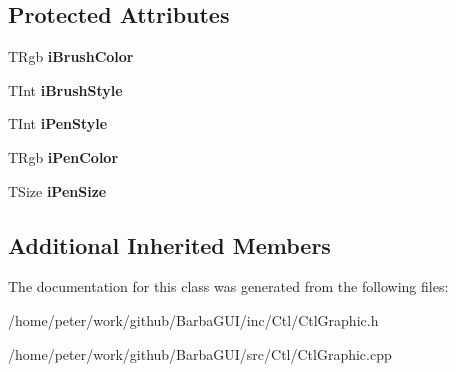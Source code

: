 \subsection*{Protected Attributes}
\begin{DoxyCompactItemize}
\item 
\mbox{\label{classCCtlRect_a10c0d7e6d949d086951b0cb5f91f3f43}} 
T\+Rgb {\bfseries i\+Brush\+Color}
\item 
\mbox{\label{classCCtlRect_a1ef3da3994db751a7463c8d7b0b38736}} 
T\+Int {\bfseries i\+Brush\+Style}
\item 
\mbox{\label{classCCtlRect_a2e0dccb3e579c7ab6041650f5d94773a}} 
T\+Int {\bfseries i\+Pen\+Style}
\item 
\mbox{\label{classCCtlRect_af31ea80a496344a97a174f578dbf0042}} 
T\+Rgb {\bfseries i\+Pen\+Color}
\item 
\mbox{\label{classCCtlRect_ae47ad0330838319d1c76d21c3bed61a9}} 
T\+Size {\bfseries i\+Pen\+Size}
\end{DoxyCompactItemize}
\subsection*{Additional Inherited Members}


The documentation for this class was generated from the following files\+:\begin{DoxyCompactItemize}
\item 
/home/peter/work/github/\+Barba\+G\+U\+I/inc/\+Ctl/Ctl\+Graphic.\+h\item 
/home/peter/work/github/\+Barba\+G\+U\+I/src/\+Ctl/Ctl\+Graphic.\+cpp\end{DoxyCompactItemize}
